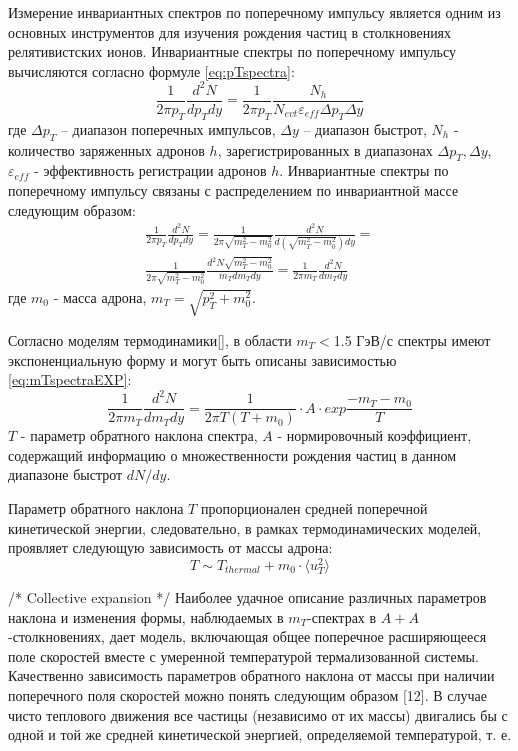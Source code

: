 Измерение инвариантных спектров по поперечному импульсу является одним из основных инструментов для изучения рождения частиц в столкновениях релятивистских ионов.
Инвариантные спектры по поперечному импульсу вычисляются согласно формуле \ref{eq:pTspectra}:
\begin{equation}
	\label{eq:pTspectra}
	\frac{1}{2\pi p_T} \frac{d^2 N}{dp_T dy}=\frac{1}{2\pi p_T}\frac{N_h}{N_{evt} \varepsilon_{eff} \Delta p_T \Delta y}
\end{equation}
где $\Delta p_T$ – диапазон поперечных импульсов, $\Delta y$ – диапазон быстрот, $N_h$ - количество заряженных адронов $h$, зарегистрированных в диапазонах  $\Delta p_T, \Delta y$,  $\varepsilon_{eff}$ - эффективность регистрации адронов $h$.
Инвариантные спектры по поперечному импульсу связаны с распределением по инвариантной массе следующим образом:
\begin{equation}
	\label{eq:mTspectra}
	\begin{split}
		\frac{1}{2\pi p_T} \frac{d^2 N}{dp_T dy}=
		\frac{1}{2\pi \sqrt{m_T^2-m_0^2}} \frac{d^2 N}{d(\sqrt{m_T^2-m_0^2})dy}=\\
		\frac{1}{2\pi \sqrt{m_T^2-m_0^2}} \frac{d^2 N \sqrt{m_T^2-m_0^2}}{m_T dm_Tdy}=\frac{1}{2\pi m_T} \frac{d^2 N}{dm_Tdy}
	\end{split}
\end{equation}
где $m_0$ - масса адрона, $m_T = \sqrt{p_{T}^{2}+m_0^2}$.


Согласно моделям термодинамики[], в области $m_T<$1.5 ГэВ/с спектры имеют экспоненциальную форму и могут быть описаны  зависимостью \ref{eq:mTspectraEXP}:
\begin{equation}
	\label{eq:mTspectraEXP}
	\frac{1}{2\pi m_T} \frac{d^2 N}{dm_T dy}=\frac{1}{2\pi T (T+m_0)}\cdot A \cdot exp{\frac{-m_T -m_0}{T}}
\end{equation}
$T$ - параметр обратного наклона спектра, $A$ - нормировочный коэффициент, содержащий информацию о множественности рождения частиц в данном диапазоне быстрот $dN/dy$.

Параметр обратного наклона $T$ пропорционален средней поперечной кинетической энергии, следовательно, в рамках термодинамических моделей, проявляет следующую зависимость от массы адрона:
$$ T \sim T_{thermal}+m_0 \cdot \langle u_T ^2 \rangle$$


/* Collective expansion */
Наиболее удачное описание различных параметров наклона и изменения формы, наблюдаемых в $m_T$-спектрах в $A+A$-столкновениях, дает модель, включающая общее поперечное расширяющееся поле скоростей вместе с умеренной температурой термализованной системы. Качественно зависимость параметров обратного наклона от массы при наличии поперечного поля скоростей можно понять следующим образом [12]. В случае чисто теплового движения все частицы (независимо от их массы) двигались бы с одной и той же средней кинетической энергией, определяемой температурой, т. е.


